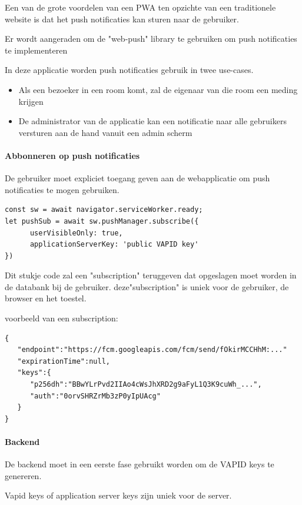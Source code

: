 		Een van de grote voordelen van een PWA ten opzichte van een traditionele website is dat het push notificaties kan sturen naar de gebruiker.
		
		Er wordt aangeraden om de "web-push" library te gebruiken om push notificaties te implementeren
		
		In deze applicatie worden push notificaties gebruik in twee use-cases. 
		\begin{itemize}
			\item 	Als een bezoeker in een room komt, zal de eigenaar van die room een meding krijgen
			\item 	De administrator van de applicatie kan een notificatie naar alle gebruikers versturen aan de hand vanuit een admin scherm
		\end{itemize}	
		
		\paragraph{Abbonneren op push notificaties}
			 De gebruiker moet expliciet toegang geven aan de webapplicatie om push notificaties te mogen gebruiken.
			 
\begin{lstlisting}
const sw = await navigator.serviceWorker.ready;
let pushSub = await sw.pushManager.subscribe({
      userVisibleOnly: true,
      applicationServerKey: 'public VAPID key'
})
\end{lstlisting}

			Dit stukje code zal een "subscription" teruggeven dat opgeslagen moet worden in de databank bij de gebruiker. deze"subscription" is uniek voor de gebruiker, de browser en het toestel.
			\autocite{Gaunt2019a}
			
			voorbeeld van een subscription:
	
\begin{lstlisting}
{
   "endpoint":"https://fcm.googleapis.com/fcm/send/fOkirMCCHhM:..."
   "expirationTime":null,
   "keys":{
      "p256dh":"BBwYLrPvd2IIAo4cWsJhXRD2g9aFyL1Q3K9cuWh_...",
      "auth":"0orvSHRZrMb3zP0yIpUAcg"
   }
}
\end{lstlisting}


		\paragraph{Backend}
			De backend moet in een eerste fase gebruikt worden om de VAPID keys te genereren.
			
			Vapid keys of application server keys zijn uniek voor de server.
			
